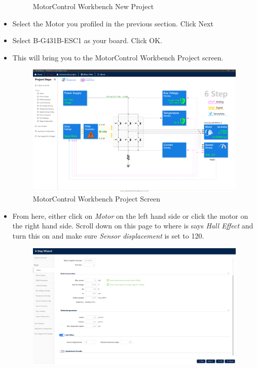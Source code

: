 \documentclass[10pt]{article}
\begin{document}
\begin{itemize}
\begin{figure}[H]
                        \caption{MotorControl Workbench New Project}
                    \end{figure}
                \item Select the Motor you profiled in the previous section. Click Next
                \item Select B-G431B-ESC1 as your board. Click OK.
                \item This will bring you to the MotorControl Workbench Project screen. 
                    \begin{figure}[H]
                        \centerline{\includegraphics[width=\textwidth]{References/MCW Project Screen.png}}
                        \caption{MotorControl Workbench Project Screen}
                    \end{figure}
                \item From here, either click on \emph{Motor} on the left hand side or click the motor on the right hand side. Scroll down on this page to where is says \emph{Hall Effect} and turn this on and make sure \emph{Sensor displacement} is set to 120.
                    \begin{figure}[H]
                        \centerline{\includegraphics[width=\textwidth]{References/MCW 6-step Hall-Effect Motor.png}}

\end{figure}
\end{itemize}
\end{document}
